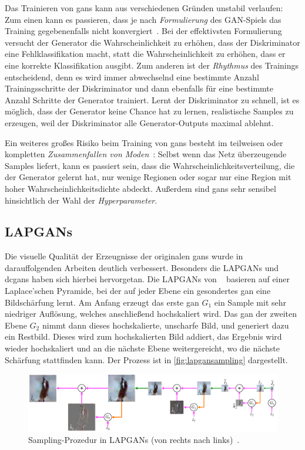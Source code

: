 Das Trainieren von \glspl{gan} kann aus verschiedenen Gründen unstabil verlaufen:
Zum einen kann es passieren, dass je nach \emph{Formulierung} des GAN-Spiels das Training gegebenenfalls nicht konvergiert~\cite{Goodfellow.2014}.
Bei der effektivsten Formulierung versucht der Generator die Wahrscheinlichkeit zu erhöhen, dass der Diskriminator eine Fehlklassifikation macht, statt die Wahrscheinlichkeit zu erhöhen, dass er eine korrekte Klassifikation ausgibt.
Zum anderen ist der \emph{Rhythmus} des Trainings entscheidend, denn es wird immer abwechselnd eine bestimmte Anzahl Trainingsschritte der Diskriminator und dann ebenfalls für eine bestimmte Anzahl Schritte der Generator trainiert.
Lernt der Diskriminator zu schnell, ist es möglich, dass der Generator keine Chance hat zu lernen, realistische Samples zu erzeugen, weil der Diskriminator alle Generator-Outputs maximal ablehnt.

Ein weiteres großes Risiko beim Training von \glspl{gan} besteht im teilweisen oder kompletten \emph{Zusammenfallen von Moden}~\cite{Che.2016}:
Selbst wenn das Netz überzeugende Samples liefert, kann es passiert sein, dass die Wahrscheinlichkeitsverteilung, die der Generator gelernt hat, nur wenige Regionen oder sogar nur eine Region mit hoher Wahrscheinlichkeitsdichte abdeckt.
Außerdem sind \glspl{gan} sehr sensibel hinsichtlich der Wahl der \emph{Hyperparameter}.



\subsection{LAPGANs}

Die visuelle Qualität der Erzeugnisse der originalen \glspl{gan} wurde in darauffolgenden Arbeiten deutlich verbessert.
Besonders die LAPGANs und \glspl{dcgan} haben sich hierbei hervorgetan.
Die LAPGANs von \citeauthor{Denton.2015}~\cite{Denton.2015} basieren auf einer Laplace'schen Pyramide, bei der auf jeder Ebene ein gesondertes \gls{gan} eine Bildschärfung lernt.
Am Anfang erzeugt das erste \gls{gan} $ G_1 $ ein Sample mit sehr niedriger Auflösung, welches anschließend hochskaliert wird.
Das \gls{gan} der zweiten Ebene $ G_2 $ nimmt dann dieses hochskalierte, unscharfe Bild, und generiert dazu ein Restbild.
Dieses wird zum hochskalierten Bild addiert, das Ergebnis wird wieder hochskaliert und an die nächste Ebene weitergereicht, wo die nächste Schärfung stattfinden kann.
Der Prozess ist in \autoref{fig:lapgansampling} dargestellt.

\begin{figure}
	\centering
	\includegraphics[width=0.9\linewidth]{img/lapgan_sampling}
	\caption{Sampling-Prozedur in LAPGANs (von rechts nach links)~\cite{Denton.2015}.}
	\label{fig:lapgansampling}
\end{figure}

